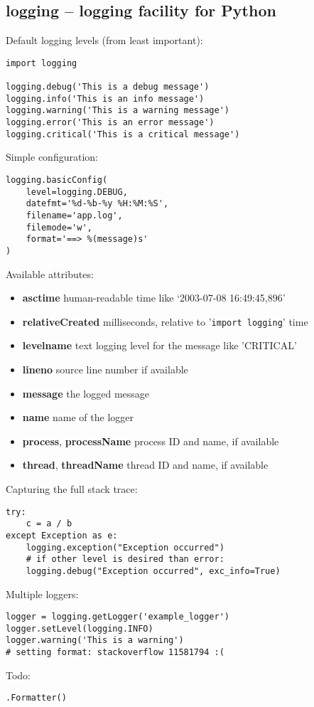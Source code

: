 \subsection{logging -- logging facility for Python}
Default logging levels (from least important):
\begin{verbatim}
import logging

logging.debug('This is a debug message')
logging.info('This is an info message')
logging.warning('This is a warning message')
logging.error('This is an error message')
logging.critical('This is a critical message')
\end{verbatim}

Simple configuration:
\begin{verbatim}
logging.basicConfig(
    level=logging.DEBUG,
    datefmt='%d-%b-%y %H:%M:%S',
    filename='app.log',
    filemode='w',
    format='==> %(message)s'
)
\end{verbatim}

Available attributes:
\begin{itemize}
	\item \textbf{asctime} human-readable time like ‘2003-07-08 16:49:45,896’
	\item \textbf{relativeCreated} milliseconds, relative to '\texttt{import logging}' time
	\item \textbf{levelname} text logging level for the message like 'CRITICAL'
	\item \textbf{lineno} source line number if available
	\item \textbf{message} the logged message
	\item \textbf{name} name of the logger
	\item \textbf{process}, \textbf{processName} process ID and name, if available
	\item \textbf{thread}, \textbf{threadName} thread ID and name, if available
\end{itemize}

Capturing the full stack trace:
\begin{verbatim}
try:
    c = a / b
except Exception as e:
    logging.exception("Exception occurred")
    # if other level is desired than error:
    logging.debug("Exception occurred", exc_info=True)
\end{verbatim}

Multiple loggers:
\begin{verbatim}
logger = logging.getLogger('example_logger')
logger.setLevel(logging.INFO)
logger.warning('This is a warning')
# setting format: stackoverflow 11581794 :(
\end{verbatim}

Todo:
\begin{verbatim}
.Formatter()
\end{verbatim}
